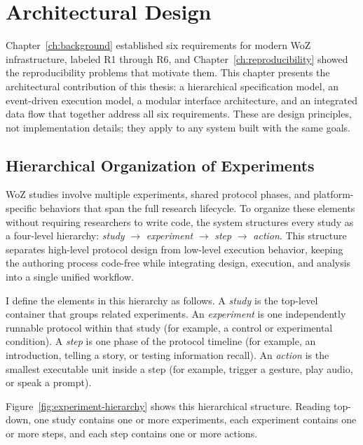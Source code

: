 \chapter{Architectural Design}
\label{ch:design}

Chapter~\ref{ch:background} established six requirements for modern WoZ infrastructure, labeled R1 through R6, and Chapter~\ref{ch:reproducibility} showed the reproducibility problems that motivate them. This chapter presents the architectural contribution of this thesis: a hierarchical specification model, an event-driven execution model, a modular interface architecture, and an integrated data flow that together address all six requirements. These are design principles, not implementation details; they apply to any system built with the same goals.

\section{Hierarchical Organization of Experiments}

WoZ studies involve multiple experiments, shared protocol phases, and platform-specific behaviors that span the full research lifecycle. To organize these elements without requiring researchers to write code, the system structures every study as a four-level hierarchy: \emph{study} $\rightarrow$ \emph{experiment} $\rightarrow$ \emph{step} $\rightarrow$ \emph{action}. This structure separates high-level protocol design from low-level execution behavior, keeping the authoring process code-free while integrating design, execution, and analysis into a single unified workflow.

I define the elements in this hierarchy as follows. A \emph{study} is the top-level container that groups related experiments. An \emph{experiment} is one independently runnable protocol within that study (for example, a control or experimental condition). A \emph{step} is one phase of the protocol timeline (for example, an introduction, telling a story, or testing information recall). An \emph{action} is the smallest executable unit inside a step (for example, trigger a gesture, play audio, or speak a prompt).

Figure~\ref{fig:experiment-hierarchy} shows this hierarchical structure. Reading top-down, one study contains one or more experiments, each experiment contains one or more steps, and each step contains one or more actions.

